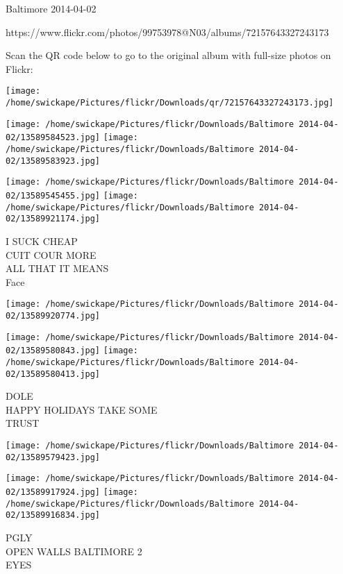 \documentclass[10pt,letterpaper]{article}
\begin{document}
Baltimore 2014-04-02

https://www.flickr.com/photos/99753978@N03/albums/72157643327243173

Scan the QR code below to go to the original album with full-size photos on Flickr:

\texttt{[image: /home/swickape/Pictures/flickr/Downloads/qr/72157643327243173.jpg]}
\pagebreak

\texttt{[image: /home/swickape/Pictures/flickr/Downloads/Baltimore 2014-04-02/13589584523.jpg]}
\texttt{[image: /home/swickape/Pictures/flickr/Downloads/Baltimore 2014-04-02/13589583923.jpg]}

\texttt{[image: /home/swickape/Pictures/flickr/Downloads/Baltimore 2014-04-02/13589545455.jpg]}
\texttt{[image: /home/swickape/Pictures/flickr/Downloads/Baltimore 2014-04-02/13589921174.jpg]}

I SUCK CHEAP\\
CUIT COUR MORE\\
ALL THAT IT MEANS\\
Face\\
\pagebreak

\texttt{[image: /home/swickape/Pictures/flickr/Downloads/Baltimore 2014-04-02/13589920774.jpg]}

\vspace{0.25in}
\texttt{[image: /home/swickape/Pictures/flickr/Downloads/Baltimore 2014-04-02/13589580843.jpg]}
\texttt{[image: /home/swickape/Pictures/flickr/Downloads/Baltimore 2014-04-02/13589580413.jpg]}

DOLE\\
HAPPY HOLIDAYS TAKE SOME\\
TRUST\\
\pagebreak

\texttt{[image: /home/swickape/Pictures/flickr/Downloads/Baltimore 2014-04-02/13589579423.jpg]}

\vspace{0.25in}
\texttt{[image: /home/swickape/Pictures/flickr/Downloads/Baltimore 2014-04-02/13589917924.jpg]}
\texttt{[image: /home/swickape/Pictures/flickr/Downloads/Baltimore 2014-04-02/13589916834.jpg]}

PGLY\\
OPEN WALLS BALTIMORE 2\\
EYES\\
\pagebreak
\end{document}
